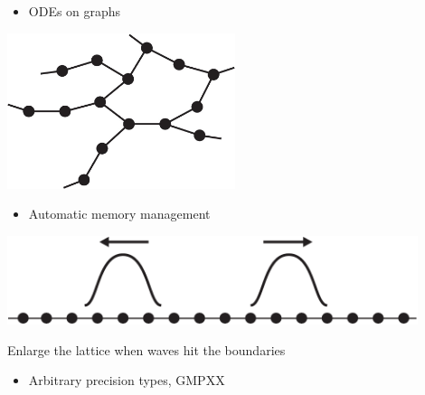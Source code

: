 \begin{frame}[fragile]


\vspace{2ex}

\begin{minipage}[c]{0.35\textwidth}
\begin{itemize}\item ODEs on graphs\end{itemize}
\end{minipage} \hspace{1ex}
\begin{minipage}[c]{0.6\textwidth}
\includegraphics[draft=false,width=0.5\textwidth]{graph.jpg}
\end{minipage}

\vspace{2ex}
\begin{minipage}[c]{0.35\textwidth}
\begin{itemize}\item Automatic memory management\end{itemize}
\end{minipage} \hspace{1ex}
\begin{minipage}[c]{0.6\textwidth}
\includegraphics[draft=false,width=0.9\textwidth]{self_expanding_lattice.pdf}

\vspace{0.5ex}
{\scriptsize Enlarge the lattice when waves hit the boundaries}
\end{minipage}

\vspace{2ex}
\begin{itemize}\item Arbitrary precision types, GMPXX\end{itemize}



\end{frame}
